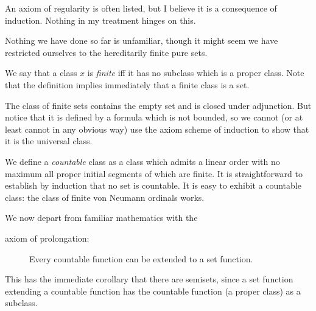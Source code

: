 \documentclass{slides}
\begin{document}
\begin{slide}

An axiom of regularity is often listed, but I believe it is a consequence of induction.  Nothing in my treatment hinges on this.

\end{slide}

\begin{slide}

Nothing we have done so far is unfamiliar, though it might seem we have restricted ourselves to the hereditarily finite pure sets.

We say that a class $x$ is {\em finite\/} iff it has no subclass which is a proper class.  Note that the definition implies immediately that a finite class is a set.

The class of finite sets contains the empty set and is closed under adjunction.  But notice that it is defined by
a formula which is not bounded, so we cannot (or at least cannot in any obvious way) use the axiom scheme of induction to show that it is the universal class.


\end{slide}

\begin{slide}

We define a {\em countable\/} class as a class which admits a linear order with no maximum all proper initial segments of which are finite.  It is straightforward to establish by induction that no set is countable.  It is easy to exhibit a countable class:  the class of finite von Neumann ordinals works.

We now depart from familiar mathematics with the

\begin{description}

\item[axiom of prolongation:]  Every countable function can be extended to a set function.

\end{description}

This has the immediate corollary that there are semisets, since a set function extending a countable function has the countable function (a proper class) as a subclass.

\end{slide}
\end{document}
